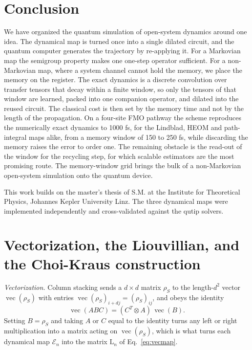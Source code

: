 \documentclass[aps,pra,twocolumn,superscriptaddress,nofootinbib,longbibliography]{revtex4-2}
\DeclareMathOperator{\vecc}{vec}
\newcommand{\rhoS}{\rho_{S}}
\newcommand{\Emap}{\mathcal{E}}
\newcommand{\Lmap}{\mathrm{L}}
\begin{document}
\section{Conclusion}
\label{sec:conclusion}
We have organized the quantum simulation of open-system dynamics around one idea.
The dynamical map is turned once into a single dilated circuit, and the quantum
computer generates the trajectory by re-applying it. For a Markovian map the
semigroup property makes one one-step operator sufficient. For a non-Markovian
map, where a system channel cannot hold the memory, we place the memory on the
register. The exact dynamics is a discrete convolution over transfer tensors that
decay within a finite window, so only the tensors of that window are learned,
packed into one companion operator, and dilated into the reused circuit. The
classical cost is then set by the memory time and not by the length of the
propagation. On a four-site FMO pathway the scheme reproduces the numerically
exact dynamics to 1000 fs, for the Lindblad, HEOM and path-integral maps alike,
from a memory window of 150 to 250 fs, while discarding the memory raises the
error to order one. The remaining obstacle is the read-out of the window for the
recycling step, for which scalable estimators are the most promising route. The
memory-window grid brings the bulk of a non-Markovian open-system simulation onto
the quantum device.

\begin{acknowledgments}
This work builds on the master's thesis of S.M. at the Institute for Theoretical
Physics, Johannes Kepler University Linz. The three dynamical maps were
implemented independently and cross-validated against the qutip solvers.
\end{acknowledgments}

\appendix

\section{Vectorization, the Liouvillian, and the Choi-Kraus construction}
\label{app:vec}
\emph{Vectorization.} Column stacking sends a $d\times d$ matrix $\rhoS$ to the
length-$d^2$ vector $\vecc(\rhoS)$ with entries $\vecc(\rhoS)_{i+dj}=(\rhoS)_{ij}$,
and obeys the identity
\begin{equation}
  \label{eq:vecid}
  \vecc(ABC)=(C^{T}\otimes A)\,\vecc(B).
\end{equation}
Setting $B=\rhoS$ and taking $A$ or $C$ equal to the identity turns any left or
right multiplication into a matrix acting on $\vecc(\rhoS)$, which is what turns
each dynamical map $\Emap_n$ into the matrix $\Lmap_n$ of Eq.~\eqref{eq:vecmap}.
\end{document}
